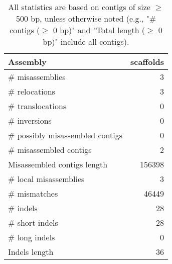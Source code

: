 \documentclass[12pt,a4paper]{article}
\begin{document}
\begin{table}[ht]
\begin{center}
\caption{All statistics are based on contigs of size $\geq$ 500 bp, unless otherwise noted (e.g., "\# contigs ($\geq$ 0 bp)" and "Total length ($\geq$ 0 bp)" include all contigs).}
\begin{tabular}{|l*{1}{|r}|}
\hline
Assembly & scaffolds \\ \hline
\# misassemblies & 3 \\ \hline
\hspace{5mm}\# relocations & 3 \\ \hline
\hspace{5mm}\# translocations & 0 \\ \hline
\hspace{5mm}\# inversions & 0 \\ \hline
\# possibly misassembled contigs & 0 \\ \hline
\# misassembled contigs & 2 \\ \hline
Misassembled contigs length & 156398 \\ \hline
\# local misassemblies & 3 \\ \hline
\# mismatches & 46449 \\ \hline
\# indels & 28 \\ \hline
\hspace{5mm}\# short indels & 28 \\ \hline
\hspace{5mm}\# long indels & 0 \\ \hline
Indels length & 36 \\ \hline
\end{tabular}
\end{center}
\end{table}
\end{document}
